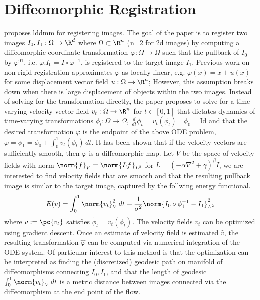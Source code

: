 \documentclass[11pt]{article}
\begin{document}
\section{Diffeomorphic Registration}

\cite{begComputingLargeDeformation2005} proposes lddmm for registering images. The goal of the paper is to register two images $I_0,I_1: \Omega\to\R^d$ where $\Omega\subset\R^n$ (n=2 for 2d images) by computing a diffeomorphic coordinate transformation $\varphi:\Omega\to\Omega$ such that the pullback of $I_0$ by $\varphi^{01}$, i.e. $\varphi.I_0 = I\circ \varphi^{-1}$, is registered to the target image $I_1$. Previous work on non-rigid registration approximates $\varphi$ as locally linear, e.g. $\varphi(x) = x + u(x)$ for some displacement vector field $u:\Omega\to\R^n$; However, this assumption breaks down when there is large displacement of objects within the two images. Instead of solving for the transformation directly, the paper proposes to solve for a time-varying velocity vector field $v_t: \Omega\to\R^n$ for $t\in [0,1]$ that dictates dynamics of time-varying transformations $\phi_t: \Omega\to\Omega$, $\frac{d}{dt} \phi_t = v_t(\phi_t) \quad \phi_0 = \text{Id}$ and that the desired transformation $\varphi$ is the endpoint of the above ODE problem, $\varphi  = \phi_1 = \phi_0 + \int_0^1 v_t(\phi_t) \, dt$.
It has been shown that if the velocity vectors are sufficiently smooth, then $\varphi$ is a diffeomorphic map. Let $V$ be the space of velocity fields with norm $\norm{f}_V = \norm{Lf}_{L^2}$ for $L = (-\alpha \nabla^2 + \gamma)^{\beta} I$, we are interested to find velocity fields that are smooth and that the resulting pullback image is similar to the target image, captured by the follwing energy functional.
\begin{align}
    E(v)
        = \int_0^1 \norm{v_t}_V^2 \, dt + \frac{1}{\sigma^2} \norm{ I_0 \circ \phi_1^{-1} - I_1 }_{L^2}^2
\end{align}
where $v := \pc{v_t}$ satisfies $\dot{\phi_t} =  v_t(\phi_t)$. The velocity fields $v_t$ can be optimized using gradient descent. Once an estimate of velocity field is estimated $\hat{v}$, the resulting transformation $\hat{\varphi}$ can be computed via numerical integration of the ODE system. Of particular interest to this method is that the optimization can be interpreted as finding the (discretized) geodesic path on manifold of diffeomorphisms connecting $I_0,I_1$, and that the length of geodesic $\int_0^1 \norm{v_t}_V \, dt$ is a metric distance between images connected via the diffeomorphism at the end point of the flow.
\end{document}
